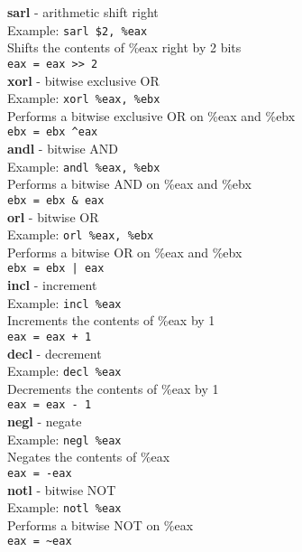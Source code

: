 \documentclass[answers,12pt,addpoints]{exam}
\begin{document}
\textbf{sarl} - arithmetic shift right \\
Example: \texttt{sarl \$2, \%eax} \\
Shifts the contents of \%eax right by 2 bits \\
\texttt{eax = eax >> 2} \\

\textbf{xorl} - bitwise exclusive OR \\
Example: \texttt{xorl \%eax, \%ebx} \\
Performs a bitwise exclusive OR on \%eax and \%ebx \\
\texttt{ebx = ebx \textasciicircum eax} \\

\textbf{andl} - bitwise AND \\
Example: \texttt{andl \%eax, \%ebx} \\
Performs a bitwise AND on \%eax and \%ebx \\
\texttt{ebx = ebx \& eax} \\

\textbf{orl} - bitwise OR \\
Example: \texttt{orl \%eax, \%ebx} \\
Performs a bitwise OR on \%eax and \%ebx \\
\texttt{ebx = ebx | eax} \\

\textbf{incl} - increment \\
Example: \texttt{incl \%eax} \\
Increments the contents of \%eax by 1 \\
\texttt{eax = eax + 1} \\

\textbf{decl} - decrement \\
Example: \texttt{decl \%eax} \\
Decrements the contents of \%eax by 1 \\
\texttt{eax = eax - 1} \\

\textbf{negl} - negate \\
Example: \texttt{negl \%eax} \\
Negates the contents of \%eax \\
\texttt{eax = -eax} \\

\textbf{notl} - bitwise NOT \\
Example: \texttt{notl \%eax} \\
Performs a bitwise NOT on \%eax \\
\texttt{eax = \textasciitilde eax} \\
\end{document}
